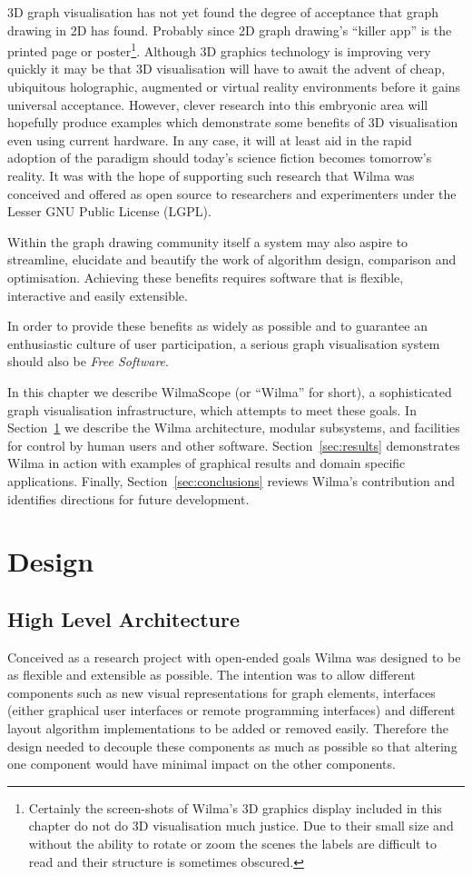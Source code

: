 \documentclass[runningheads]{cl2emult}
\begin{document}
3D graph visualisation has not yet found the degree of acceptance that
graph drawing in 2D has found.  Probably since 2D graph drawing's
``killer app'' is the printed page or poster\footnote{Certainly the
screen-shots of Wilma's 3D graphics display included in this chapter
do not do 3D visualisation much justice.  Due to their small size and
without the ability to rotate or zoom the scenes the labels are 
difficult to read and their structure is sometimes obscured.}.
Although 3D graphics
technology is improving very quickly it may be that 3D visualisation
will have to await the advent of cheap, ubiquitous holographic,
augmented or virtual reality environments before it gains universal
acceptance.  However, clever research into this embryonic area will
hopefully produce examples which demonstrate some benefits of 3D
visualisation even using current hardware.  In any case, it will
at least aid in the rapid adoption of the paradigm should today's
science fiction becomes tomorrow's reality.
It was with the hope of supporting such research that Wilma was conceived
and offered as open
source to researchers and experimenters under the Lesser GNU Public
License (LGPL).

Within the graph drawing community itself a system may also aspire to 
streamline, elucidate and beautify the work of algorithm design, comparison
and optimisation.  Achieving these benefits requires software that is
flexible, interactive and easily extensible.

In order to provide these benefits as widely as possible and to guarantee
an enthusiastic culture of user participation, a serious graph visualisation
system should also be {\em Free Software}\cite{stallman92why}.

In this chapter we describe WilmaScope (or ``Wilma'' for short), a
sophisticated graph visualisation infrastructure, which attempts to meet
these goals.  In Section~\ref{sec:design} we describe the Wilma
architecture, modular subsystems, and facilities for control by human users
and other software.  Section~\ref{sec:results} demonstrates Wilma in action
with examples of graphical results and domain specific applications.
Finally, Section~\ref{sec:conclusions} reviews Wilma's contribution and
identifies directions for future development.

\section{Design}\label{sec:design}
\subsection{High Level Architecture}
Conceived as a research project with open-ended goals Wilma was
designed to be as flexible and extensible as possible.  The intention
was to allow different components such as new visual representations
for graph elements, interfaces (either graphical user interfaces or
remote programming interfaces) and different 
layout algorithm implementations to be added or removed easily.
Therefore the design needed to decouple these components as much as
possible so that altering one component would have minimal impact on
the other components.
\end{document}
